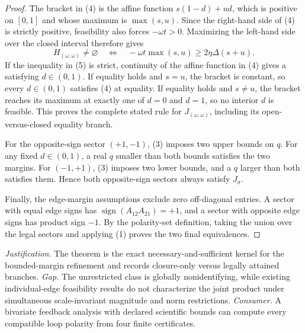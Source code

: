 \documentclass{article}
\begin{document}
\begin{proof}
The bracket in (4) is the affine function \(s(1-d)+ud\), which is positive on \([0,1]\) and whose maximum is \(\max(s,u)\). Since the right-hand side of (4) is strictly positive, feasibility also forces \(-\omega t>0\). Maximizing the left-hand side over the closed interval therefore gives
\[
H_{(\omega,\omega)}\ne\varnothing
\quad\Longleftrightarrow\quad
-\omega t\max(s,u)\ge2\eta\Delta(s+u). \tag{5}
\]
If the inequality in (5) is strict, continuity of the affine function in (4) gives a satisfying \(d\in(0,1)\). If equality holds and \(s=u\), the bracket is constant, so every \(d\in(0,1)\) satisfies (4) at equality. If equality holds and \(s\ne u\), the bracket reaches its maximum at exactly one of \(d=0\) and \(d=1\), so no interior \(d\) is feasible. This proves the complete stated rule for \(J_{(\omega,\omega)}\), including its open-versus-closed equality branch.

For the opposite-sign sector \((+1,-1)\), (3) imposes two upper bounds on \(q\). For any fixed \(d\in(0,1)\), a real \(q\) smaller than both bounds satisfies the two margins. For \((-1,+1)\), (3) imposes two lower bounds, and a \(q\) larger than both satisfies them. Hence both opposite-sign sectors always satisfy \(J_{\sigma}\).

Finally, the edge-margin assumptions exclude zero off-diagonal entries. A sector with equal edge signs has \(\operatorname{sign}(A_{12}A_{21})=+1\), and a sector with opposite edge signs has product sign \(-1\). By the polarity-set definition, taking the union over the legal sectors and applying (1) proves the two final equivalences.
\end{proof}
\par\smallskip\noindent \textit{Justification.} The theorem is the exact necessary-and-sufficient kernel for the bounded-margin refinement and records closure-only versus legally attained branches. \textit{Gap.} The unrestricted class is globally nonidentifying, while existing individual-edge feasibility results do not characterize the joint product under simultaneous scale-invariant magnitude and norm restrictions. \textit{Consumer.} A bivariate feedback analysis with declared scientific bounds can compute every compatible loop polarity from four finite certificates.
\end{document}
